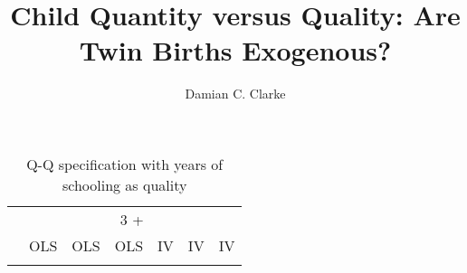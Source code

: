 \documentclass{article}[11pt,subeqn]
\title{Child Quantity versus Quality: Are Twin Births Exogenous?}
\author{Damian C. Clarke}
\begin{document}
\begin{spacing}{1.25}



\begin{sidewaystable}[!htbp]													
\caption{Q-Q specification with years of schooling as quality}													
\vspace{-3mm}													
\label{tab:YrsEduc}													
\begin{center}													
\begin{tabular}{lcccccc} \toprule													
& \multicolumn{6}{c}{3 +}  \\ \cmidrule(r){2-7}													
& OLS& OLS& OLS & IV & IV& IV   \\ \midrule													
\begin{footnotesize}\end{footnotesize}&\begin{footnotesize}\end{footnotesize}&\begin{footnotesize}\end{footnotesize}&\begin{footnotesize}\end{footnotesize}&\begin{footnotesize}\end{footnotesize}&\begin{footnotesize}\end{footnotesize}&\begin{footnotesize}\end{footnotesize}\\													
													

\end{tabular}
\end{center}
\end{sidewaystable}
\end{spacing}
\end{document}
